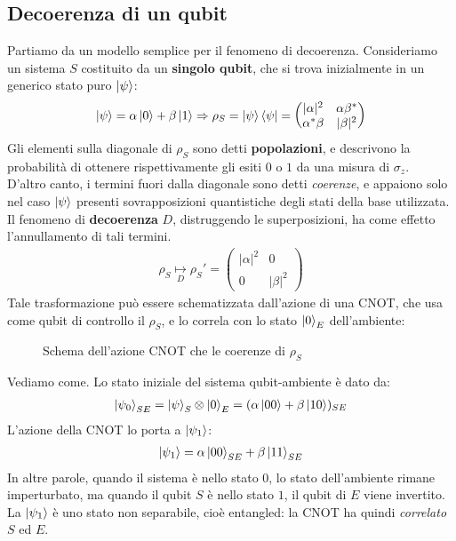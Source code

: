 \documentclass[../../InformazioneQuantistica.tex]{subfiles}
\begin{document}
\subsection{Decoerenza di un qubit}
Partiamo da un modello semplice per il fenomeno di decoerenza. Consideriamo un sistema $S$ costituito da un \textbf{singolo qubit}, che si trova inizialmente in un generico stato puro $\Ket{\psi}$:
\begin{align*}
\Ket{\psi}=\alpha\Ket{0} + \beta \Ket{1} \Rightarrow  \rho_S = \Ket{\psi}\Bra{\psi} = \begin{pmatrix} |\alpha|^2 & \alpha \beta^* \\ \alpha^* \beta & |\beta|^2 \end{pmatrix}
\end{align*}
Gli elementi sulla diagonale di $\rho_S$ sono detti \textbf{popolazioni}, e descrivono la probabilità di ottenere rispettivamente gli esiti $0$ o $1$ da una misura di $\sigma_z$.\\
D'altro canto, i termini fuori dalla diagonale sono detti \textit{coerenze}, e appaiono solo nel caso $\Ket{\psi}$ presenti sovrapposizioni quantistiche degli stati della base utilizzata.\\

Il fenomeno di \textbf{decoerenza} $D$, distruggendo le superposizioni, ha come effetto l'annullamento di tali termini. 
\begin{align*}
\rho_S \underset{D}{\mapsto} \rho_S' =  \begin{pmatrix}|\alpha|^2 & 0 \\ 0 & |\beta|^2
\end{pmatrix}
\end{align*}
Tale trasformazione può essere schematizzata dall'azione di una CNOT, che usa come qubit di controllo il $\rho_S$, e lo correla con lo stato $\Ket{0}_E$ dell'ambiente:
\begin{figure}[H]
\centering

\caption{Schema dell'azione CNOT che  le coerenze di $\rho_S$\label{fig:qubit-CNOT}}
\end{figure}
Vediamo come. Lo stato iniziale del sistema qubit-ambiente è dato da:
\begin{align*}
\Ket{\psi_0}_{SE} = \Ket{\psi}_S\otimes \Ket{0}_E = (\alpha\Ket{00}+\beta\Ket{10})_{SE}
\end{align*}
L'azione della CNOT lo porta a $\Ket{\psi_1}$:
\begin{align}
\Ket{\psi_1}=\alpha\Ket{00}_{SE}+\beta\Ket{11}_{SE}
\label{eqn:stato-no-decoerenza}
\end{align}
In altre parole, quando il sistema è nello stato $0$, lo stato dell'ambiente rimane imperturbato, ma quando il qubit $S$ è nello stato $1$, il qubit di $E$ viene invertito.\\
La $\Ket{\psi_1}$ è uno stato non separabile, cioè entangled: la CNOT ha quindi \textit{correlato} $S$ ed $E$.\\
\end{document}
